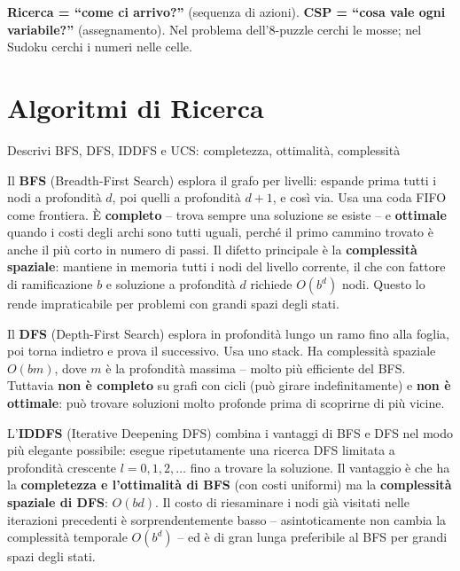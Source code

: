 \documentclass[12pt,a4paper]{article}
\begin{document}
\begin{ricordabox}
\textbf{Ricerca = ``come ci arrivo?''} (sequenza di azioni). \textbf{CSP = ``cosa vale ogni variabile?''} (assegnamento). Nel problema dell'8-puzzle cerchi le mosse; nel Sudoku cerchi i numeri nelle celle.
\end{ricordabox}

\section{Algoritmi di Ricerca}

\begin{domandabox}{Descrivi BFS, DFS, IDDFS e UCS: completezza, ottimalità, complessità}
\end{domandabox}

Il \textbf{BFS} (Breadth-First Search) esplora il grafo per livelli: espande prima tutti i nodi a profondità $d$, poi quelli a profondità $d+1$, e così via. Usa una coda FIFO come frontiera. È \textbf{completo} -- trova sempre una soluzione se esiste -- e \textbf{ottimale} quando i costi degli archi sono tutti uguali, perché il primo cammino trovato è anche il più corto in numero di passi. Il difetto principale è la \textbf{complessità spaziale}: mantiene in memoria tutti i nodi del livello corrente, il che con fattore di ramificazione $b$ e soluzione a profondità $d$ richiede $O(b^d)$ nodi. Questo lo rende impraticabile per problemi con grandi spazi degli stati.

Il \textbf{DFS} (Depth-First Search) esplora in profondità lungo un ramo fino alla foglia, poi torna indietro e prova il successivo. Usa uno stack. Ha complessità spaziale $O(bm)$, dove $m$ è la profondità massima -- molto più efficiente del BFS. Tuttavia \textbf{non è completo} su grafi con cicli (può girare indefinitamente) e \textbf{non è ottimale}: può trovare soluzioni molto profonde prima di scoprirne di più vicine.

L'\textbf{IDDFS} (Iterative Deepening DFS) combina i vantaggi di BFS e DFS nel modo più elegante possibile: esegue ripetutamente una ricerca DFS limitata a profondità crescente $l = 0, 1, 2, \ldots$ fino a trovare la soluzione. Il vantaggio è che ha la \textbf{completezza e l'ottimalità di BFS} (con costi uniformi) ma la \textbf{complessità spaziale di DFS}: $O(bd)$. Il costo di riesaminare i nodi già visitati nelle iterazioni precedenti è sorprendentemente basso -- asintoticamente non cambia la complessità temporale $O(b^d)$ -- ed è di gran lunga preferibile al BFS per grandi spazi degli stati.
\end{document}
